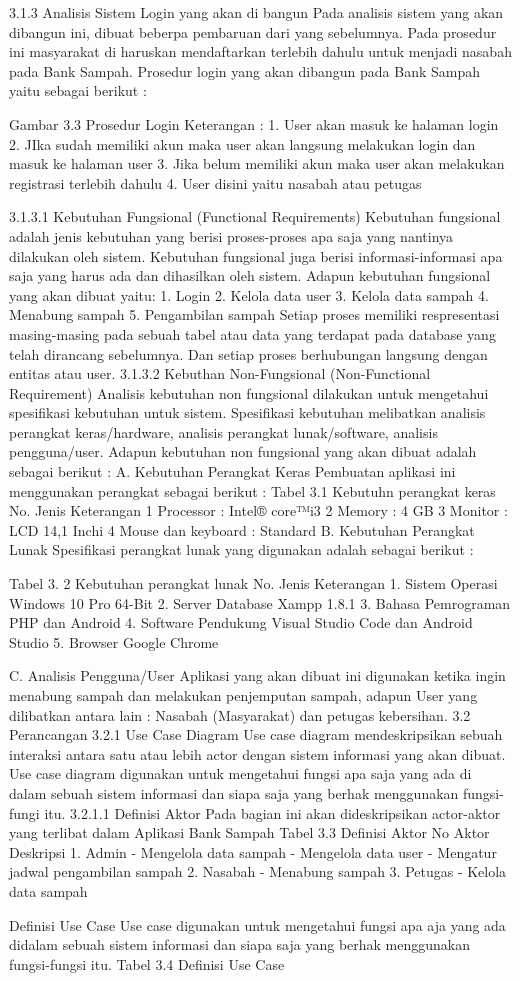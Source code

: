 3.1.3	Analisis Sistem Login yang akan di bangun
Pada analisis sistem yang akan dibangun ini, dibuat beberpa pembaruan dari yang  sebelumnya. Pada prosedur ini masyarakat di haruskan mendaftarkan terlebih dahulu untuk menjadi nasabah pada Bank Sampah. Prosedur login yang akan dibangun pada Bank Sampah yaitu sebagai berikut :
 
Gambar 3.3 Prosedur Login
Keterangan :	
1.	User akan masuk ke halaman login 
2.	JIka sudah memiliki akun maka user akan langsung melakukan login dan masuk ke halaman user
3.	Jika belum memiliki akun maka user akan melakukan registrasi terlebih dahulu 
4.	User disini yaitu nasabah atau petugas

3.1.3.1	Kebutuhan Fungsional (Functional Requirements)
Kebutuhan fungsional adalah jenis kebutuhan yang berisi proses-proses apa saja yang nantinya dilakukan oleh sistem. Kebutuhan fungsional juga berisi informasi-informasi apa saja yang harus ada dan dihasilkan oleh sistem.
Adapun kebutuhan fungsional yang akan dibuat yaitu:
1.	Login
2.	Kelola data user
3.	Kelola data sampah
4.	Menabung sampah
5.	Pengambilan sampah
Setiap proses memiliki respresentasi masing-masing pada sebuah tabel atau data yang terdapat pada database yang telah dirancang sebelumnya. Dan setiap proses berhubungan langsung dengan entitas atau user.
3.1.3.2	Kebuthan Non-Fungsional (Non-Functional Requirement)
Analisis kebutuhan non fungsional dilakukan untuk mengetahui spesifikasi kebutuhan untuk sistem. Spesifikasi kebutuhan melibatkan analisis perangkat keras/hardware, analisis perangkat lunak/software, analisis pengguna/user.
Adapun kebutuhan non fungsional yang akan dibuat adalah sebagai berikut :
A.	Kebutuhan Perangkat Keras
Pembuatan aplikasi ini menggunakan perangkat sebagai berikut :
Tabel 3.1 Kebutuhn perangkat keras
No.	Jenis	 	Keterangan
1	Processor	:	Intel® core™i3 
2	Memory	:	4 GB
3	Monitor	:	LCD 14,1 Inchi
4	Mouse dan keyboard	:	Standard
B.	Kebutuhan Perangkat Lunak
Spesifikasi perangkat lunak yang digunakan adalah sebagai berikut :

Tabel 3. 2 Kebutuhan perangkat lunak
No.	Jenis	Keterangan
1.	Sistem Operasi	Windows 10 Pro 64-Bit
2.	Server Database	Xampp 1.8.1
3.	Bahasa Pemrograman	PHP dan Android
4.	Software Pendukung	Visual Studio Code dan Android Studio 
5.	Browser	Google Chrome

C.	Analisis Pengguna/User
Aplikasi yang akan dibuat ini digunakan ketika ingin menabung sampah dan melakukan penjemputan sampah, adapun User yang dilibatkan antara lain : Nasabah (Masyarakat) dan petugas kebersihan.
3.2	Perancangan
3.2.1	Use Case Diagram
Use case diagram mendeskripsikan sebuah interaksi antara satu atau lebih actor dengan sistem informasi yang akan dibuat. Use case diagram digunakan untuk mengetahui fungsi apa saja yang ada di dalam sebuah sistem informasi dan siapa saja yang berhak menggunakan fungsi-fungi itu.
3.2.1.1	Definisi Aktor
Pada bagian ini akan dideskripsikan actor-aktor yang terlibat dalam Aplikasi Bank Sampah
Tabel 3.3 Definisi Aktor
No	Aktor	Deskripsi
1.	Admin	-	Mengelola data sampah
-	Mengelola data user
-	Mengatur jadwal pengambilan sampah
2.
	Nasabah	-	Menabung sampah 
3.	Petugas	-	Kelola data sampah

Definisi Use Case
Use case digunakan untuk mengetahui fungsi apa aja yang ada didalam sebuah sistem informasi dan siapa saja yang berhak menggunakan fungsi-fungsi itu.
Tabel 3.4 Definisi Use Case
